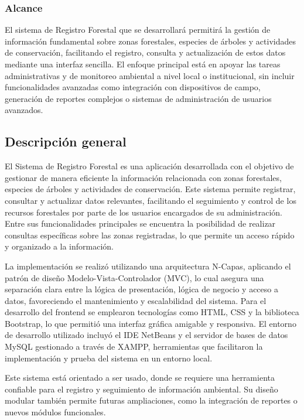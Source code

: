 \subsubsection{Alcance}
El sistema de Registro Forestal que se desarrollará permitirá la gestión de información fundamental sobre zonas forestales, especies de árboles y actividades de conservación, facilitando el registro, consulta y actualización de estos datos mediante una interfaz sencilla. El enfoque principal está en apoyar las tareas administrativas y de monitoreo ambiental a nivel local o institucional, sin incluir funcionalidades avanzadas como integración con dispositivos de campo, generación de reportes complejos o sistemas de administración de usuarios avanzados.

\subsection{Descripción general}
El Sistema de Registro Forestal es una aplicación desarrollada con el objetivo de gestionar de manera eficiente la información relacionada con zonas forestales, especies de árboles y actividades de conservación. Este sistema permite registrar, consultar y actualizar datos relevantes, facilitando el seguimiento y control de los recursos forestales por parte de los usuarios encargados de su administración. Entre sus funcionalidades principales se encuentra la posibilidad de realizar consultas específicas sobre las zonas registradas, lo que permite un acceso rápido y organizado a la información.

La implementación se realizó utilizando una arquitectura N-Capas, aplicando el patrón de diseño Modelo-Vista-Controlador (MVC), lo cual asegura una separación clara entre la lógica de presentación, lógica de negocio y acceso a datos, favoreciendo el mantenimiento y escalabilidad del sistema. Para el desarrollo del frontend se emplearon tecnologías como HTML, CSS y la biblioteca Bootstrap, lo que permitió una interfaz gráfica amigable y responsiva. El entorno de desarrollo utilizado incluyó el IDE NetBeans y el servidor de bases de datos MySQL gestionado a través de XAMPP, herramientas que facilitaron la implementación y prueba del sistema en un entorno local.

Este sistema está orientado a ser usado, donde se requiere una herramienta confiable para el registro y seguimiento de información ambiental. Su diseño modular también permite futuras ampliaciones, como la integración de reportes o nuevos módulos funcionales.

